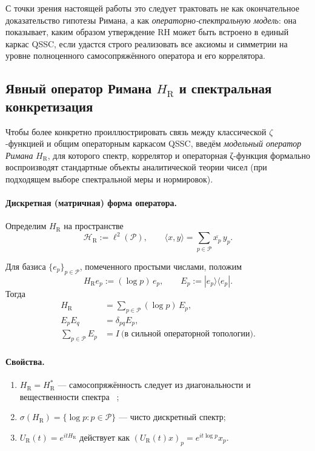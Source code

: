\documentclass{article}
\numberwithin{equation}{section}
\theoremstyle{plain}
\theoremstyle{definition}
\theoremstyle{remark}
\def\delta{δ}\def\Delta{Δ}\def\epsilon{ε}\def\zeta{ζ}%
\begin{document}
\noindent
С точки зрения настоящей работы это следует трактовать не как
окончательное доказательство гипотезы Римана, а как
\emph{операторно-спектральную модель}: она показывает, каким образом
утверждение RH может быть встроено в единый каркас QSSC,
если удастся строго реализовать все аксиомы и симметрии на уровне
полноценного самосопряжённого оператора и его коррелятора.

\subsection*{Явный оператор Римана $H_{\mathrm{R}}$ и спектральная конкретизация}

\noindent
Чтобы более конкретно проиллюстрировать связь между классической
$\zeta$-функцией и общим операторным каркасом QSSC, введём
\emph{модельный оператор Римана} $H_{\mathrm{R}}$, для которого спектр,
коррелятор и операторная ζ-функция формально воспроизводят стандартные
объекты аналитической теории чисел (при подходящем выборе спектральной
меры и нормировок).



\paragraph{Дискретная (матричная) форма оператора.}

Определим $H_{\mathrm{R}}$ на пространстве
\begin{equation}
\mathcal H_{\mathrm{R}} := \ell^2(\mathcal P), \qquad
\langle x,y\rangle = \sum_{p\in\mathcal P}\overline{x_p}\,y_p.
\end{equation}

Для базиса $\{e_p\}_{p\in\mathcal P}$, помеченного простыми числами,
положим
\begin{equation}
H_{\mathrm{R}} e_p := (\log p)\,e_p, \qquad
E_p := |e_p\rangle\langle e_p|.
\end{equation}
Тогда
\begin{equation}
	\begin{aligned}
		H_{\mathrm{R}} &= \sum_{p\in\mathcal P} (\log p)\,E_p,\\
		E_pE_q &= \delta_{pq}E_p,\\
		\sum_{p\in\mathcal P}E_p &= I
		\ \text{(в сильной операторной топологии).}
	\end{aligned}
\end{equation}

\paragraph{Свойства.}
\begin{enumerate}[label=(\alph*), leftmargin=2em]
  \item $H_{\mathrm{R}}=H_{\mathrm{R}}^\ast$ — самосопряжённость следует из диагональности и вещественности спектра ~\cite{Rudin1991};
  \item $\sigma(H_{\mathrm{R}})=\{\log p : p\in\mathcal P\}$ — чисто дискретный спектр;
  \item $U_{\mathrm{R}}(t)=e^{itH_{\mathrm{R}}}$ действует как $(U_{\mathrm{R}}(t)x)_p = e^{it\log p}x_p$.
\end{enumerate}
\end{document}
